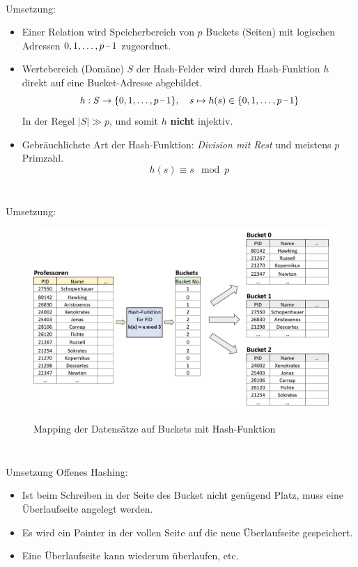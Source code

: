 \begin{frame}
\frametitle{\insertsection}
\framesubtitle{\insertsubsection}
\\[4pt]
\abs
Umsetzung: 
\begin{itemize}
	\item Einer Relation wird Speicherbereich von $p$ Buckets (Seiten) mit logischen Adressen $0, 1,\ldots, {p\text{\,--\,}1}$ zugeordnet. 
	\item Wertebereich (Dom\"ane) $S$ der Hash-Felder wird durch Hash-Funktion $h$ direkt auf eine Bucket-Adresse abgebildet. 
	$$h:S\to\{0, 1,\ldots, {p\text{\,--\,} 1}\},\quad s\mapsto h(s)\in\{0, 1,\ldots, {p\text{\,--\,} 1} \}$$
	In der Regel $\vert S\vert\gg p$, und somit $h$ \textbf{nicht} injektiv.
	\item Gebr\"auchlichste Art der Hash-Funktion: \emph{Division mit Rest} und meistens $p$ Primzahl.
	$$h(s) \equiv s\mod p$$
\end{itemize}		
\end{frame}

\begin{frame}
\frametitle{\insertsection}
\framesubtitle{\insertsubsection}
\\[4pt]
Umsetzung: 
\begin{figure}
\includegraphics[scale=0.35, trim=0 0 0 4cm]{img/Hash-Bucket-1.png}
\\[-8pt]\caption{Mapping der Datens\"atze auf Buckets mit Hash-Funktion}
\end{figure}
\end{frame}

\begin{frame}
\frametitle{\insertsection}
\framesubtitle{\insertsubsection}
\\[4pt]
\abs
Umsetzung Offenes Hashing: 
\begin{itemize}
	\item Ist beim Schreiben in der Seite des Bucket nicht genügend Platz, muss eine \"Uberlaufseite angelegt werden.
	\item Es wird ein Pointer in der vollen Seite auf die neue \"Uberlaufseite gespeichert.
	\item Eine \"Uberlaufseite kann wiederum \"uberlaufen, etc.
\end{itemize}		
\end{frame}

